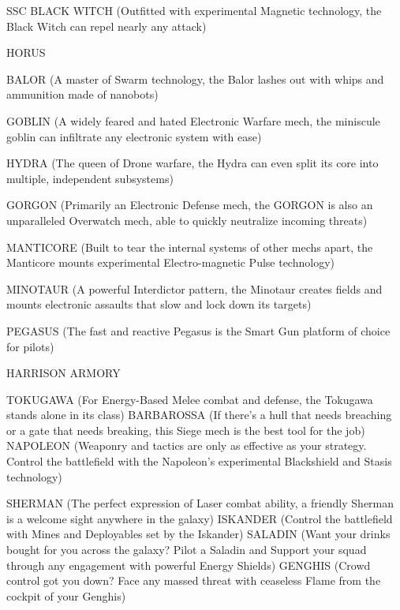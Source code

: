 SSC BLACK WITCH (Outfitted with experimental Magnetic technology, the Black Witch can
repel nearly any attack)


                                             HORUS




BALOR (A master of Swarm technology, the Balor lashes out with whips and ammunition made
of nanobots)

GOBLIN (A widely feared and hated Electronic Warfare mech, the miniscule goblin can infiltrate
any electronic system with ease)

HYDRA (The queen of Drone warfare, the Hydra can even split its core into multiple,
independent subsystems)

GORGON (Primarily an Electronic Defense mech, the GORGON is also an unparalleled
Overwatch mech, able to quickly neutralize incoming threats)

MANTICORE (Built to tear the internal systems of other mechs apart, the Manticore mounts
experimental Electro-magnetic Pulse technology)

MINOTAUR (A powerful Interdictor pattern, the Minotaur creates fields and mounts electronic
assaults that slow and lock down its targets)

PEGASUS (The fast and reactive Pegasus is the Smart Gun platform of choice for pilots)


                                   HARRISON ARMORY

TOKUGAWA (For Energy-Based Melee combat and defense, the Tokugawa stands alone in its
class)
BARBAROSSA (If there’s a hull that needs breaching or a gate that needs breaking, this Siege
mech is the best tool for the job)
NAPOLEON (Weaponry and tactics are only as effective as your strategy. Control the battlefield
with the Napoleon’s experimental Blackshield and Stasis technology)

SHERMAN (The perfect expression of Laser combat ability, a friendly Sherman is a welcome
sight anywhere in the galaxy)
ISKANDER (Control the battlefield with Mines and Deployables set by the Iskander)
SALADIN (Want your drinks bought for you across the galaxy? Pilot a Saladin and Support your
squad through any engagement with powerful Energy Shields)
GENGHIS (Crowd control got you down? Face any massed threat with ceaseless Flame from
the cockpit of your Genghis)

